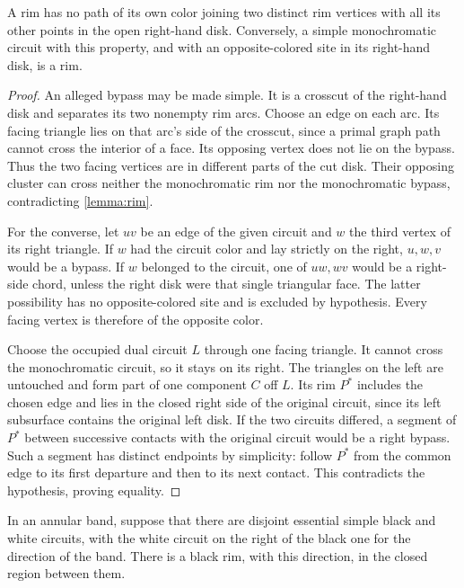 \begin{lemma}\label{lemma:no-bypass}
A rim has no path of its own color joining two distinct rim vertices with
all its other points in the open right-hand disk.  Conversely, a simple
monochromatic circuit with this property, and with an opposite-colored site
in its right-hand disk, is a rim.
\end{lemma}

\begin{proof}
An alleged bypass may be made simple.  It is a crosscut of the right-hand
disk and separates its two nonempty rim arcs.  Choose an edge on each arc.
Its facing triangle lies on that arc's side of the crosscut, since a
primal graph path cannot cross the interior of a face.  Its opposing
vertex does not lie on the bypass.  Thus the two facing vertices are in
different parts of the cut disk.  Their opposing cluster can cross neither
the monochromatic rim nor the monochromatic bypass, contradicting
\cref{lemma:rim}.

For the converse, let $uv$ be an edge of the given circuit and $w$ the third
vertex of its right triangle.  If $w$ had the circuit color and lay strictly
on the right, $u,w,v$ would be a bypass.  If $w$ belonged to the circuit,
one of $uw,wv$ would be a right-side chord, unless the right disk were that
single triangular face.  The latter possibility has no opposite-colored
site and is excluded by hypothesis.  Every facing vertex is therefore of
the opposite color.

Choose the occupied dual circuit $L$ through one facing triangle.  It
cannot cross the monochromatic circuit, so it stays on its right.  The
triangles on the left are untouched and form part of one component $C$
off $L$.  Its rim $P^*$ includes the chosen edge and lies in the closed
right side of the original circuit, since its left subsurface contains
the original left disk.  If the two circuits differed, a segment of $P^*$
between successive contacts with the original circuit would be a right
bypass.  Such a segment has distinct endpoints by simplicity: follow
$P^*$ from the common edge to its first departure and then to its next
contact.  This contradicts the hypothesis, proving equality.
\end{proof}

\begin{lemma}[Sandwich]\label{lemma:sandwich}
In an annular band, suppose that there are disjoint essential simple black
and white circuits, with the white circuit on the right of the black one
for the direction of the band.  There is a black rim, with this direction,
in the closed region between them.
\end{lemma}

